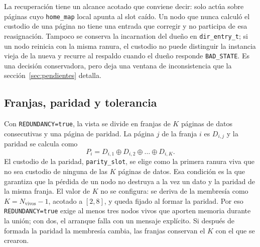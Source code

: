 \documentclass[11pt,spanish]{article}
\begin{document}
La recuperación tiene un alcance acotado que conviene decir: solo actúa sobre páginas cuyo \texttt{home\_map} local apunta al slot caído. Un nodo que nunca calculó el custodio de una página no tiene una entrada que corregir y no participa de esa reasignación. Tampoco se conserva la incarnation del dueño en \texttt{dir\_entry\_t}; si un nodo reinicia con la misma ranura, el custodio no puede distinguir la instancia vieja de la nueva y recurre al respaldo cuando el dueño responde \texttt{BAD\_STATE}. Es una decisión conservadora, pero deja una ventana de inconsistencia que la sección~\ref{sec:pendientes} detalla.

\subsection{Franjas, paridad y tolerancia}

Con \texttt{REDUNDANCY=true}, la vista se divide en franjas de $K$ páginas de datos consecutivas y una página de paridad. La página $j$ de la franja $i$ es $D_{i,j}$ y la paridad se calcula como
\begin{equation}
P_i = D_{i,1} \oplus D_{i,2} \oplus \dots \oplus D_{i,K}.
\end{equation}
El custodio de la paridad, \texttt{parity\_slot}, se elige como la primera ranura viva que no sea custodio de ninguna de las $K$ páginas de datos. Esa condición es la que garantiza que la pérdida de un nodo no destruya a la vez un dato y la paridad de la misma franja. El valor de $K$ no se configura: se deriva de la membresía como $K = N_{\text{vivos}} - 1$, acotado a $[2,8]$, y queda fijado al formar la paridad. Por eso \texttt{REDUNDANCY=true} exige al menos tres nodos vivos que aporten memoria durante la unión; con dos, el arranque falla con un mensaje explícito. Si después de formada la paridad la membresía cambia, las franjas conservan el $K$ con el que se crearon.
\end{document}
